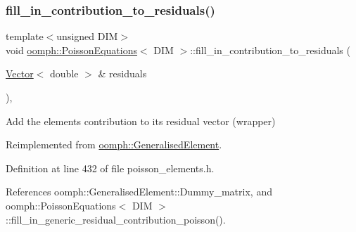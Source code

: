 \subsubsection{\texorpdfstring{fill\+\_\+in\+\_\+contribution\+\_\+to\+\_\+residuals()}{fill\_in\_contribution\_to\_residuals()}}
{\footnotesize\ttfamily template$<$unsigned D\+IM$>$ \\
void \hyperlink{classoomph_1_1PoissonEquations}{oomph\+::\+Poisson\+Equations}$<$ D\+IM $>$\+::fill\+\_\+in\+\_\+contribution\+\_\+to\+\_\+residuals (\begin{DoxyParamCaption}\item[{\hyperlink{classoomph_1_1Vector}{Vector}$<$ double $>$ \&}]{residuals }\end{DoxyParamCaption})\hspace{0.3cm}{\ttfamily [inline]}, {\ttfamily [virtual]}}



Add the element\textquotesingle{}s contribution to its residual vector (wrapper) 



Reimplemented from \hyperlink{classoomph_1_1GeneralisedElement_a310c97f515e8504a48179c0e72c550d7}{oomph\+::\+Generalised\+Element}.



Definition at line 432 of file poisson\+\_\+elements.\+h.



References oomph\+::\+Generalised\+Element\+::\+Dummy\+\_\+matrix, and oomph\+::\+Poisson\+Equations$<$ D\+I\+M $>$\+::fill\+\_\+in\+\_\+generic\+\_\+residual\+\_\+contribution\+\_\+poisson().

\mbox{\label{classoomph_1_1PoissonEquations_a02c40bfa9b59fa7935677999623da633}} 
